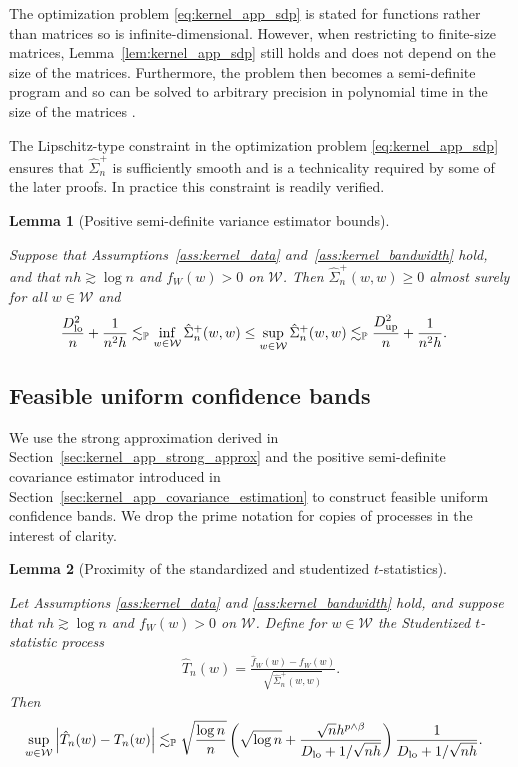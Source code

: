 \documentclass[11pt,lof]{puthesis}
\renewcommand{\P}{\ensuremath{\mathbb{P}}}
\newcommand{\cW}{\ensuremath{\mathcal{W}}}
\newcommand{\Dl}{\ensuremath{D_{\textup{lo}}}}
\newcommand{\Du}{\ensuremath{D_{\textup{up}}}}
\theoremstyle{break}
\newtheorem{lemma}{Lemma}[section]
\theoremstyle{proof}
\begin{document}
The optimization problem \eqref{eq:kernel_app_sdp} is stated for functions
rather than
matrices so is infinite-dimensional. However, when restricting to finite-size
matrices, Lemma~\ref{lem:kernel_app_sdp} still holds and does not depend on the
size of the matrices. Furthermore, the problem then becomes a semi-definite
program and so can be solved to arbitrary precision in polynomial time in the
size of the matrices \citep{laurent2005semidefinite}.

The Lipschitz-type constraint in the optimization problem
\eqref{eq:kernel_app_sdp}
ensures that $\hat \Sigma_n^+$ is sufficiently smooth and is a technicality
required by some of the later proofs. In practice this constraint is readily
verified.

\begin{lemma}[Positive semi-definite variance estimator bounds]
  \label{lem:kernel_app_variance_estimator_bounds}

  Suppose that Assumptions~\ref{ass:kernel_data}
  and~\ref{ass:kernel_bandwidth} hold, and that
  $n h \gtrsim \log n$ and $f_W(w) > 0$ on $\cW$.
  Then $\hat \Sigma_n^+(w,w) \geq 0$
  almost surely for all $w \in \cW$ and
  \begin{align*}
    \frac{\Dl^2}{n} + \frac{1}{n^2h}
    &\lesssim_\P
    \inf_{w \in \cW} \hat \Sigma_n^+(w,w)
    \leq
    \sup_{w \in \cW} \hat \Sigma_n^+(w,w)
    \lesssim_\P
    \frac{\Du^2}{n} + \frac{1}{n^2h}.
  \end{align*}

\end{lemma}

\subsection{Feasible uniform confidence bands}

We use the strong approximation derived in
Section~\ref{sec:kernel_app_strong_approx} and the
positive semi-definite covariance estimator introduced in
Section~\ref{sec:kernel_app_covariance_estimation} to construct feasible
uniform confidence bands. We drop the prime notation for copies of processes in
the interest of clarity.

\begin{lemma}[Proximity of the standardized and studentized $t$-statistics]
  \label{lem:kernel_app_studentized_t_statistic}

  Let Assumptions \ref{ass:kernel_data} and
  \ref{ass:kernel_bandwidth} hold, and suppose that
  $n h \gtrsim \log n$ and $f_W(w) > 0$ on $\cW$.
  Define for $w \in \cW$
  the Studentized $t$-statistic process
  \begin{align*}
    \hat T_n(w) = \frac{\hat f_W(w) - f_W(w)}
    {\sqrt{\hat\Sigma_n^+(w,w)}}.
  \end{align*}
  Then
  \begin{align*}
    \sup_{w \in \cW}
    \left| \hat T_n(w) - T_n(w) \right|
    &\lesssim_\P
    \sqrt{\frac{\log n}{n}}
    \left(
      \sqrt{\log n} + \frac{\sqrt n h^{p \wedge \beta}}
      {\Dl + 1/\sqrt{n h}}
    \right)
    \frac{1}{\Dl + 1/\sqrt{n h}}.
  \end{align*}

\end{lemma}
\end{document}
